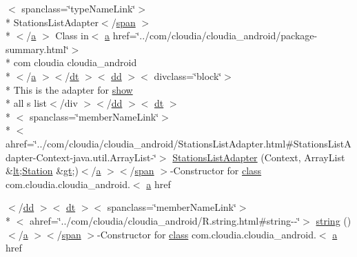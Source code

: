 \begin{DoxyCompactItemize}
$<$ spanclass=\char`\"{}type\-Name\-Link\char`\"{}$>$\\*
 Stations\-List\-Adapter$<$/\hyperlink{stylesheet_8css_a8343996ebcf16220b04e54659aac31cc}{span} $>$\\*
$<$/\hyperlink{style_8css_a5e8981582017bb8b84c21f148345d1f7}{a} $>$ Class in$<$ \hyperlink{style_8css_a5e8981582017bb8b84c21f148345d1f7}{a} href=\char`\"{}../com/cloudia/cloudia\-\_\-android/package-\/summary.\-html\char`\"{}$>$\\*
 com cloudia cloudia\-\_\-android\\*
$<$/\hyperlink{style_8css_a5e8981582017bb8b84c21f148345d1f7}{a} $>$$<$/\hyperlink{stylesheet_8css_a107565fb4039d33b041380d6e0ea1d80}{dt} $>$$<$ \hyperlink{stylesheet_8css_a47f4718a86835a7771ec592ece845221}{dd} $>$$<$ divclass=\char`\"{}block\char`\"{}$>$\\*
 This is the adapter for \hyperlink{script_8js_a158319aa84db2086ce4f90b3e62f8a38}{show} \\*
all s list$<$/div $>$$<$/\hyperlink{stylesheet_8css_a47f4718a86835a7771ec592ece845221}{dd} $>$$<$ \hyperlink{stylesheet_8css_a107565fb4039d33b041380d6e0ea1d80}{dt} $>$\\*
$<$ spanclass=\char`\"{}member\-Name\-Link\char`\"{}$>$\\*
$<$ ahref=\char`\"{}../com/cloudia/cloudia\-\_\-android/Stations\-List\-Adapter.\-html\#Stations\-List\-Adapter-\/Context-\/java.\-util.\-Array\-List-\/\char`\"{}$>$ \hyperlink{index-17_8html_ad751a55465d9cfae312a77063713cc8e}{Stations\-List\-Adapter} (Context, Array\-List \&\hyperlink{overview-tree_8html_aac3322e12d911341c3d470b46b2d80f4}{lt};\hyperlink{index-17_8html_ac2375aa22a64908f3538d08a030e35bd}{Station} \&\hyperlink{overview-tree_8html_a1bb4447113f0bd7bf49e2b3dee2e065d}{gt};)$<$/\hyperlink{style_8css_a5e8981582017bb8b84c21f148345d1f7}{a} $>$$<$/\hyperlink{stylesheet_8css_a8343996ebcf16220b04e54659aac31cc}{span} $>$-\/Constructor for \hyperlink{_tools_8html_acf06f836132665ba8114f5a414c2403f}{class} com.\-cloudia.\-cloudia\-\_\-android.$<$ \hyperlink{style_8css_a5e8981582017bb8b84c21f148345d1f7}{a} href
\item 
$<$/\hyperlink{stylesheet_8css_a47f4718a86835a7771ec592ece845221}{dd} $>$$<$ \hyperlink{stylesheet_8css_a107565fb4039d33b041380d6e0ea1d80}{dt} $>$$<$ spanclass=\char`\"{}member\-Name\-Link\char`\"{}$>$\\*
$<$ ahref=\char`\"{}../com/cloudia/cloudia\-\_\-android/R.\-string.\-html\#string-\/-\/\char`\"{}$>$ \hyperlink{index-17_8html_abd5fc08c07311a696bb9d8fb49da0fed}{string} ()$<$/\hyperlink{style_8css_a5e8981582017bb8b84c21f148345d1f7}{a} $>$$<$/\hyperlink{stylesheet_8css_a8343996ebcf16220b04e54659aac31cc}{span} $>$-\/Constructor for \hyperlink{_tools_8html_acf06f836132665ba8114f5a414c2403f}{class} com.\-cloudia.\-cloudia\-\_\-android.$<$ \hyperlink{style_8css_a5e8981582017bb8b84c21f148345d1f7}{a} href
$$
\end{DoxyCompactItemize}
